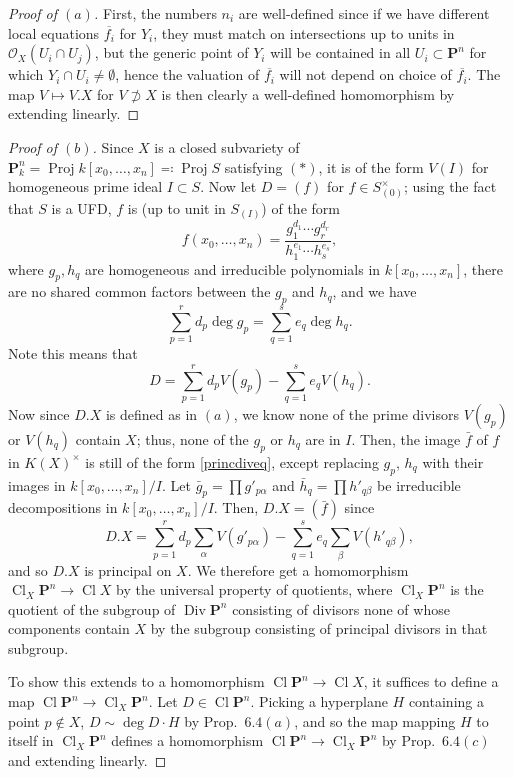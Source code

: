 \documentclass[10pt]{article}
\theoremstyle{definition}
\theoremstyle{remark}
\numberwithin{equation}{section}
\numberwithin{figure}{subsubsection}
\DeclareMathOperator{\Proj}{Proj}
\DeclareMathOperator{\Div}{Div}
\DeclareMathOperator{\Cl}{Cl}
\newcommand{\OO}{\mathcal{O}}
\begin{document}
\begin{proof}[Proof of $(a)$]
  First, the numbers $n_i$ are well-defined since if we have different local equations $\overline{f_i}$ for $Y_i$, they must match on intersections up to units in $\OO_X(U_i \cap U_j)$, but the generic point of $Y_i$ will be contained in all $U_i \subset \mathbf{P}^n$ for which $Y_i \cap U_i \ne \emptyset$, hence the valuation of $\overline{f_i}$ will not depend on choice of $\overline{f_i}$. The map $V \mapsto V.X$ for $V \not\supset X$ is then clearly a well-defined homomorphism by extending linearly.
\end{proof}
\begin{proof}[Proof of $(b)$]
  Since $X$ is a closed subvariety of $\mathbf{P}^n_k = \Proj k[x_0,\ldots,x_n] \eqqcolon \Proj S$ satisfying $(*)$, it is of the form $V(I)$ for homogeneous prime ideal $I \subset S$. Now let $D = (f)$ for $f \in S_{(0)}^\times$; using the fact that $S$ is a UFD, $f$ is (up to unit in $S_{(I)}$) of the form
  \begin{equation}\label{princdiveq}
    f(x_0,\ldots,x_n) = \frac{g_1^{d_1} \cdots g_r^{d_r}}{h_1^{e_1} \cdots h_s^{e_s}},
  \end{equation}
  where $g_p,h_q$ are homogeneous and irreducible polynomials in $k[x_0,\ldots,x_n]$, there are no shared common factors between the $g_p$ and $h_q$, and we have
  \begin{equation*}
    \sum_{p=1}^r d_p\deg g_p = \sum_{q=1}^s e_q \deg h_q.
  \end{equation*}
  Note this means that
  \begin{equation*}
    D = \sum_{p=1}^r d_p V(g_p) - \sum_{q=1}^s e_q V(h_q).
  \end{equation*}
  Now since $D.X$ is defined as in $(a)$, we know none of the prime divisors $V(g_p)$ or $V(h_q)$ contain $X$; thus, none of the $g_p$ or $h_q$ are in $I$. Then, the image $\bar{f}$ of $f$ in $K(X)^\times$ is still of the form \eqref{princdiveq}, except replacing $g_p$, $h_q$ with their images in $k[x_0,\ldots,x_n]/I$. Let $\bar{g}_p = \prod g'_{p\alpha}$ and $\bar{h}_q = \prod h'_{q\beta}$ be irreducible decompositions in $k[x_0,\ldots,x_n]/I$. Then, $D.X = (\bar{f})$ since
  \begin{equation*}
    D.X = \sum_{p=1}^r d_p \sum_\alpha V(g'_{p\alpha}) - \sum_{q=1}^s e_q \sum_\beta V(h'_{q\beta}),
  \end{equation*}
  and so $D.X$ is principal on $X$. We therefore get a homomorphism $\Cl_X \mathbf{P}^n \to \Cl X$ by the universal property of quotients, where $\Cl_X \mathbf{P}^n$ is the quotient of the subgroup of $\Div \mathbf{P}^n$ consisting of divisors none of whose components contain $X$ by the subgroup consisting of principal divisors in that subgroup.
  \par To show this extends to a homomorphism $\Cl \mathbf{P}^n \to \Cl X$, it suffices to define a map $\Cl \mathbf{P}^n \to \Cl_X \mathbf{P}^n$. Let $D \in \Cl \mathbf{P}^n$. Picking a hyperplane $H$ containing a point $p \notin X$, $D \sim \deg D \cdot H$ by Prop.~$6.4(a)$, and so the map mapping $H$ to itself in $\Cl_X \mathbf{P}^n$ defines a homomorphism $\Cl \mathbf{P}^n \to \Cl_X \mathbf{P}^n$ by Prop.~$6.4(c)$ and extending linearly.
\end{proof}
\end{document}
